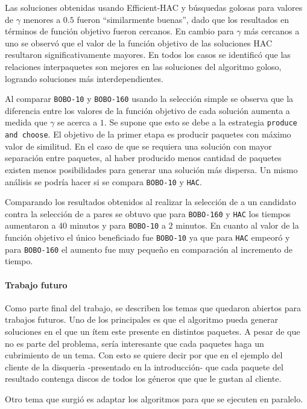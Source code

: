 Las soluciones obtenidas usando Efficient-HAC y búsquedas golosas para valores de $\gamma$ menores a $0.5$ fueron \textquotedblleft similarmente buenas\textquotedblright , dado que los resultados en términos de función objetivo fueron cercanos. En cambio para $\gamma$ más cercanos a uno se observó que el valor de la función objetivo de las soluciones HAC resultaron significativamente mayores. En todos los casos se identificó que las relaciones interpaquetes son mejores en las soluciones del algoritmo goloso, logrando soluciones más interdependientes.

Al comparar \texttt{BOBO-10} y \texttt{BOBO-160} usando la selección simple se observa que la diferencia entre los valores de la función objetivo de cada solución aumenta a medida que $\gamma$ se acerca a $1$. Se supone que esto se debe a la estrategia \texttt{produce and choose}. El objetivo de la primer etapa es producir paquetes con máximo valor de similitud. En el caso de que se requiera una solución con mayor separación entre paquetes, al haber producido menos cantidad de paquetes existen menos posibilidades para generar una solución más dispersa. Un mismo análisis se podría hacer si se compara \texttt{BOBO-10} y \texttt{HAC}.

Comparando los resultados obtenidos al realizar la selección de a un candidato contra la selección de a pares se obtuvo que para \texttt{BOBO-160} y \texttt{HAC} los tiempos aumentaron a $40$ minutos y para \texttt{BOBO-10} a $2$ minutos. En cuanto al valor de la función objetivo el único beneficiado fue \texttt{BOBO-10} ya que para \texttt{HAC} empeoró y para \texttt{BOBO-160} el aumento fue muy pequeño en comparación al incremento de tiempo.

\paragraph{Trabajo futuro} Como parte final del trabajo, se describen los temas que quedaron abiertos para trabajos futuros. Uno de los principales es que el algoritmo pueda generar soluciones en el que un ítem este presente en distintos paquetes. A pesar de que no es parte del problema, sería interesante que cada paquetes haga un cubrimiento de un tema. Con esto se quiere decir por que en el ejemplo del cliente de la disqueria -presentado en la introducción- que cada paquete del resultado contenga discos de todos los géneros que que le gustan al cliente.

Otro tema que surgió es adaptar los algoritmos para que se ejecuten en paralelo.
